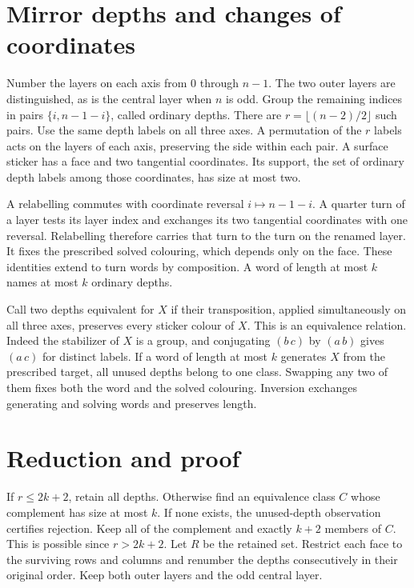 \documentclass[11pt,letterpaper]{article}
\begin{document}
\section{Mirror depths and changes of coordinates}
Number the layers on each axis from $0$ through $n-1$. The two outer
layers are distinguished, as is the central layer when $n$ is odd. Group
the remaining indices in pairs $\{i,n-1-i\}$, called ordinary depths.
There are $r=\lfloor(n-2)/2\rfloor$ such pairs. Use the same depth labels
on all three axes. A permutation of the $r$ labels acts on the layers of
each axis, preserving the side within each pair. A surface sticker has a
face and two tangential coordinates. Its support, the set of ordinary
depth labels among those coordinates, has size at most two.

A relabelling commutes with coordinate reversal $i\mapsto n-1-i$. A
quarter turn of a layer tests its layer index and exchanges its two tangential
coordinates with one reversal. Relabelling therefore carries that turn to the
turn on the renamed layer. It fixes the prescribed solved colouring, which
depends only on the face. These identities extend to turn words by composition.
A word of length at most $k$ names at most $k$ ordinary depths.

Call two depths equivalent for $X$ if their transposition, applied
simultaneously on all three axes, preserves every sticker colour of $X$.
This is an equivalence relation. Indeed the stabilizer of $X$ is a group,
and conjugating $(b\,c)$ by $(a\,b)$ gives $(a\,c)$ for distinct labels.
If a word of length at most $k$ generates $X$ from the prescribed target,
all unused depths belong to one class. Swapping any two of them fixes both
the word and the solved colouring. Inversion exchanges generating and
solving words and preserves length.

\section{Reduction and proof}
If $r\le2k+2$, retain all depths. Otherwise find an equivalence class $C$
whose complement has size at most $k$. If none exists, the unused-depth
observation certifies rejection. Keep all of the complement and exactly
$k+2$ members of $C$. This is possible since $r>2k+2$. Let $R$ be the
retained set. Restrict each face to the surviving rows and columns and
renumber the depths consecutively in their original order. Keep both outer
layers and the odd central layer.
\end{document}
